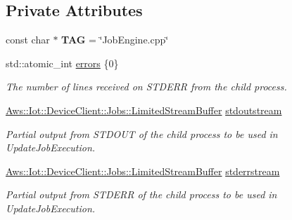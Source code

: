 \subsection*{Private Attributes}
\begin{DoxyCompactItemize}
\item 
\mbox{\label{class_aws_1_1_iot_1_1_device_client_1_1_jobs_1_1_job_engine_a3e391a699bb7c903498eead712a20288}} 
const char $\ast$ {\bfseries T\+AG} = \char`\"{}Job\+Engine.\+cpp\char`\"{}
\item 
std\+::atomic\+\_\+int \hyperlink{class_aws_1_1_iot_1_1_device_client_1_1_jobs_1_1_job_engine_a1cac8361d8365feb7b0e5807abc07e33}{errors} \{0\}
\begin{DoxyCompactList}\small\item\em The number of lines received on S\+T\+D\+E\+RR from the child process. \end{DoxyCompactList}\item 
\mbox{\label{class_aws_1_1_iot_1_1_device_client_1_1_jobs_1_1_job_engine_ac90bc5fc6289d89cb012f0d6322b520c}} 
\hyperlink{class_aws_1_1_iot_1_1_device_client_1_1_jobs_1_1_limited_stream_buffer}{Aws\+::\+Iot\+::\+Device\+Client\+::\+Jobs\+::\+Limited\+Stream\+Buffer} \hyperlink{class_aws_1_1_iot_1_1_device_client_1_1_jobs_1_1_job_engine_ac90bc5fc6289d89cb012f0d6322b520c}{stdoutstream}
\begin{DoxyCompactList}\small\item\em Partial output from S\+T\+D\+O\+UT of the child process to be used in Update\+Job\+Execution. \end{DoxyCompactList}\item 
\mbox{\label{class_aws_1_1_iot_1_1_device_client_1_1_jobs_1_1_job_engine_aefc97336f6335fb64a11ee690c22d834}} 
\hyperlink{class_aws_1_1_iot_1_1_device_client_1_1_jobs_1_1_limited_stream_buffer}{Aws\+::\+Iot\+::\+Device\+Client\+::\+Jobs\+::\+Limited\+Stream\+Buffer} \hyperlink{class_aws_1_1_iot_1_1_device_client_1_1_jobs_1_1_job_engine_aefc97336f6335fb64a11ee690c22d834}{stderrstream}
\begin{DoxyCompactList}\small\item\em Partial output from S\+T\+D\+E\+RR of the child process to be used in Update\+Job\+Execution. \end{DoxyCompactList}\end{DoxyCompactItemize}
